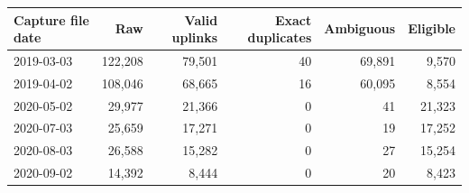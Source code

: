 \begin{tabular*}{\linewidth}{@{\extracolsep{\fill}}lrrrrr@{}}\toprule
Capture file date & Raw & Valid uplinks & Exact duplicates & Ambiguous & Eligible \\\midrule
2019-03-03 & 122,208 & 79,501 & 40 & 69,891 & 9,570 \\
2019-04-02 & 108,046 & 68,665 & 16 & 60,095 & 8,554 \\
2020-05-02 & 29,977 & 21,366 & 0 & 41 & 21,323 \\
2020-07-03 & 25,659 & 17,271 & 0 & 19 & 17,252 \\
2020-08-03 & 26,588 & 15,282 & 0 & 27 & 15,254 \\
2020-09-02 & 14,392 & 8,444 & 0 & 20 & 8,423 \\
\bottomrule\end{tabular*}
